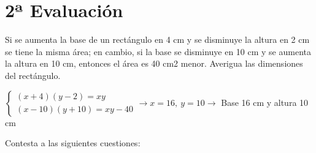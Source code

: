 \documentclass[addpoints,spanish, 12pt,a4paper]{exam}
\begin{document}
\begin{questions}
\begin{center}
\end{center}


        


\section*{2ª Evaluación}


\question[1] Si se aumenta la base de un rectángulo en 4 cm y se disminuye la altura en 2 cm se tiene la misma área; en cambio, si la base se disminuye en 10 cm y se aumenta la altura en 10 cm, entonces el área es 40 cm2 menor. Averigua las dimensiones del rectángulo.\begin{solution} $\left\{\begin{matrix}(x+4)(y-2)=xy \\ (x-10)(y+10)=xy-40\end{matrix}\right. \to  x = 16, \  y = 10 \to $ Base 16 cm y altura 10 cm \end{solution}


 \question[1] Contesta a las siguientes cuestiones:\begin{parts} 
 \part  Resuelve $\dfrac{x^{2} - 4}{x^{2} - 9} \geq  0$\begin{solution} $\left(-\infty, -3\right) \cup \left[-2, 2\right] \cup \left(3, \infty\right)$\end{solution} 

\end{parts}
\end{questions}
\end{document}
